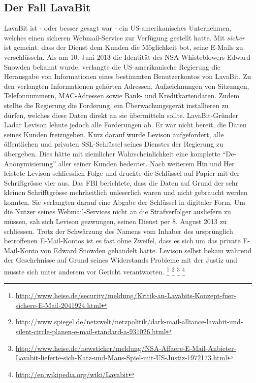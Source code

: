 \subsection{Der Fall LavaBit}
LavaBit ist - oder besser gesagt war - ein US-amerikanisches Unternehmen, welches einen sicheren Webmail-Service zur Verfügung gestellt hatte. Mit \textit{sicher} ist gemeint, dass der Dienst dem Kunden die Möglichkeit bot, seine E-Mails zu verschlüsseln. Als am 10. Juni 2013 die Identität des NSA-Whisteblowers Edward Snowden bekannt wurde, verlangte die US-amerikanische Regierung die Herausgabe von Informationen eines bestimmten Benutzerkontos von LavaBit. Zu den verlangten Informationen gehörten Adressen, Aufzeichnungen von Sitzungen, Telefonnummern, MAC-Adressen sowie Bank- und Kreditkartendaten. Zudem stellte die Regierung die Forderung, ein Überwachungsgerät installieren zu dürfen, welches diese Daten direkt an sie übermitteln sollte. LavaBit-Gründer Ladar Levison lehnte jedoch alle Forderungen ab. Er war nicht bereit, die Daten seines Kunden freizugeben. Kurz darauf wurde Levison aufgefordert, alle öffentlichen und privaten SSL-Schlüssel seines Dienstes der Regierung zu übergeben. Dies hätte mit ziemlicher Wahrscheinlichkeit eine komplette ``De-Anonymisierung'' aller seiner Kunden bedeutet. Nach weiterem Hin und Her leistete Levison schliesslich Folge und druckte die Schlüssel auf Papier mit der Schriftgrösse vier aus. Das FBI berichtete, dass die Daten auf Grund der sehr kleinen Schrifftgrösse mehrheitlich unleserlich waren und nicht gebraucht werden konnten. Sie verlangten darauf eine Abgabe der Schlüssel in digitaler Form. Um die Nutzer seines Webmail-Services nicht an die Strafverfolger ausliefern zu müssen, sah sich Levison gezwungen, seinen Dienst per 8. August 2013 zu schliessen. Trotz der Schwärzung des Namens vom Inhaber des ursprünglich betroffenen E-Mail-Kontos ist es fast ohne Zweifel, dass es sich um das private E-Mail-Konto von Edward Snowden gehandelt hatte. Levison selbst bekam während der Geschehnisse auf Grund seines Widerstands Probleme mit der Justiz und musste sich unter anderem vor Gericht verantworten.
\footnote{\url{http://www.heise.de/security/meldung/Kritik-an-Lavabits-Konzept-fuer-sichere-E-Mail-2041924.html}}
\footnote{\url{http://www.spiegel.de/netzwelt/netzpolitik/dark-mail-alliance-lavabit-und-silent-circle-planen-e-mail-standard-a-931026.html}}
\footnote{\url{http://www.heise.de/newsticker/meldung/NSA-Affaere-E-Mail-Anbieter-Lavabit-lieferte-sich-Katz-und-Maus-Spiel-mit-US-Justiz-1972173.html}}
\footnote{\url{http://en.wikipedia.org/wiki/Lavabit}}

